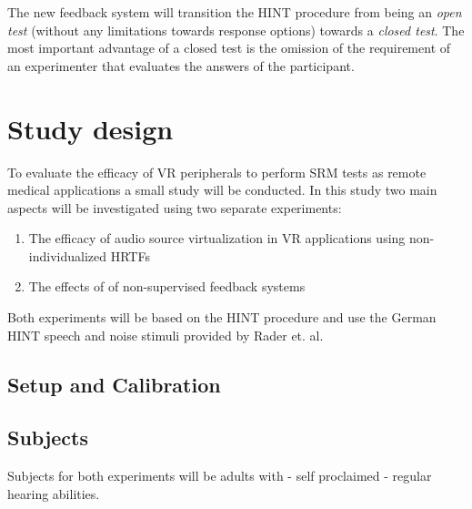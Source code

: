 \documentclass[a4paper,11pt]{article}%
\renewcommand{\\}{\vspace*{0.5\baselineskip} \newline}
\begin{document}
\newline
\newline
The new feedback system will transition the \ac{HINT} procedure from being an \textit{open test} (without any limitations towards response options) towards a \textit{closed test}. The most important advantage of a closed test is the omission of the requirement of an experimenter that evaluates the answers of the participant.


\section{Study design}
To evaluate the efficacy of \ac{VR} peripherals to perform \ac{SRM} tests as remote medical applications a small study will be conducted. In this study two main aspects will be investigated using two separate experiments:
\begin{enumerate}
	\item The efficacy of audio source virtualization in \Ac{VR} applications using non-individualized \ac{HRTF}s
	\item The effects of of non-supervised feedback systems
\end{enumerate}
Both experiments will be based on the \ac{HINT} procedure and use the German \ac{HINT} speech and noise stimuli provided by Rader et. al.


\subsection{Setup and Calibration}



\subsection{Subjects}
Subjects for both experiments will be adults with - self proclaimed - regular hearing abilities.

\end{document}
